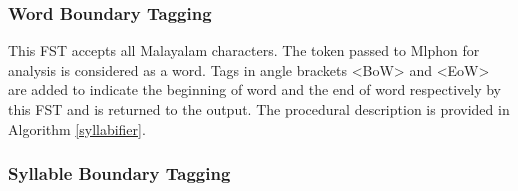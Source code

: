 \documentclass{ieeeaccess}
\begin{document}
\subsubsection{Word Boundary Tagging}

This FST accepts all Malayalam characters. The token passed to Mlphon for analysis is considered as a word. Tags in angle brackets {\ipa <BoW>} and {\ipa <EoW>} are added to indicate the beginning of word and the end of word respectively by this FST and is returned to the output. The procedural description is provided in Algorithm \ref{syllabifier}.

\subsubsection{Syllable Boundary Tagging}
\label{syllabletagger}
\end{document}

